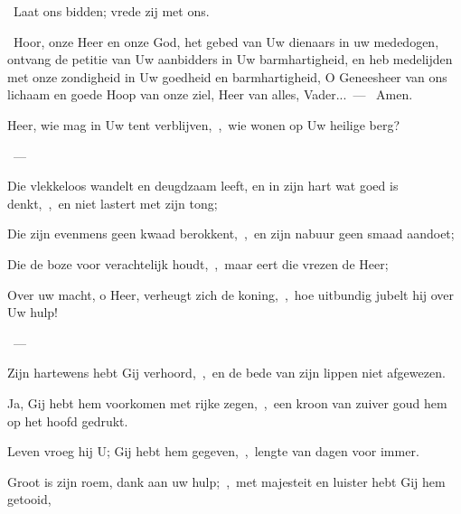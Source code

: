 \documentclass[12pt,twoside,a5paper]{article}
\begin{document}
\begin{halfparskip}
  \dd~Laat ons bidden; vrede zij met ons.

  \cc~Hoor, onze Heer en onze God, het gebed van Uw dienaars in uw mededogen, ontvang de petitie van Uw aanbidders in Uw barmhartigheid, en heb medelijden met onze zondigheid in Uw goedheid en barmhartigheid, O Geneesheer van ons lichaam en goede Hoop van onze ziel, Heer van alles, Vader...~--- \rr~Amen.
\end{halfparskip}





\begin{halfparskip}
   Heer, wie mag in Uw tent verblijven,~\sep\ wie wonen op Uw heilige berg?

  ~--- 

  Die vlekkeloos wandelt en deugdzaam leeft, en in zijn hart wat goed is denkt,~\sep\ en niet lastert met zijn tong;

  Die zijn evenmens geen kwaad berokkent,~\sep\ en zijn nabuur geen smaad aandoet;

  Die de boze voor verachtelijk houdt,~\sep\ maar eert die vrezen de Heer;
\end{halfparskip}


\begin{halfparskip}
   Over uw macht, o Heer, verheugt zich de koning,~\sep\ hoe uitbundig jubelt hij over Uw hulp!

  ~--- 

  Zijn hartewens hebt Gij verhoord,~\sep\ en de bede van zijn lippen niet afgewezen.

  Ja, Gij hebt hem voorkomen met rijke zegen,~\sep\ een kroon van zuiver goud hem op het hoofd gedrukt.

  Leven vroeg hij U; Gij hebt hem gegeven,~\sep\ lengte van dagen voor immer.

  Groot is zijn roem, dank aan uw hulp;~\sep\ met majesteit en luister hebt Gij hem getooid,
\end{halfparskip}
\end{document}
